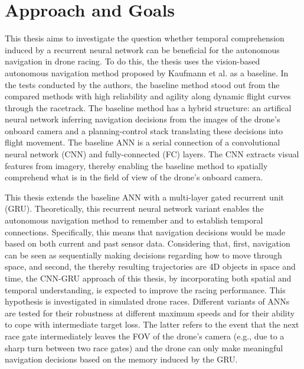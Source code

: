 \section{Approach and Goals}



This thesis aims to 
investigate the question
whether temporal comprehension 
induced by a recurrent neural network
can be beneficial for the
autonomous navigation in drone racing.
To do this, the thesis uses
the vision-based autonomous navigation method
proposed by Kaufmann et al. \cite{Kaufmann2018} as a baseline.
In the tests conducted by the authors, the baseline method
stood out from the compared methods
with high reliability and agility 
along dynamic flight curves through the racetrack.
The baseline method has a hybrid structure:
an artifical neural network 
inferring navigation decisions 
from the images of the drone's onboard camera
and a planning-control stack 
translating these decisions into flight movement.
The baseline ANN is a serial connection
of a convolutional neural network (CNN) 
and fully-connected (FC) layers.
The CNN extracts visual features from imagery,
thereby enabling the baseline method
to spatially comprehend what is in the field of view of 
the drone's onboard camera.

This thesis extends the baseline ANN
with a multi-layer gated recurrent unit (GRU).
Theoretically, this
recurrent neural network variant 
enables the autonomous navigation method
to remember and to establish temporal connections.
Specifically, this means that navigation decisions 
would be made based on both current and past sensor data.
Considering that, first, 
navigation can be seen as 
sequentially making decisions 
regarding how to move through space, and second, 
the thereby resulting trajectories 
are 4D objects in space and time, 
the CNN-GRU approach of this thesis, 
by incorporating both spatial and temporal understanding, 
is expected to improve the racing performance.
This hypothesis is investigated 
in simulated drone races. 
Different variants of ANNs 
are tested for their robustness 
at different maximum speeds 
and for their ability to cope 
with intermediate target loss.
The latter refers to the event
that the next race gate intermediately leaves the FOV of the drone's camera
(e.g., due to a sharp turn between two race gates)
and the drone can only make meaningful navigation decisions
based on the memory induced by the GRU.







